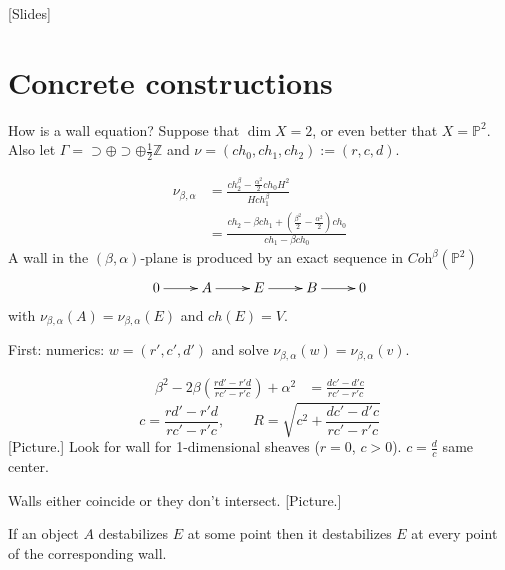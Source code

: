 [Slides]

\section{Concrete constructions}
\label{section-concrete-constructions}

How is a wall equation? Suppose that $\dim X=2$, or even better that $X=
\mathbb{P}^2$. Also let 
$\Gamma=\supset \oplus \supset \oplus \frac{1}{2}\mathbb{Z}$ and 
$\nu=(ch_0,ch_1,ch_2):=(r,c,d)$.

\begin{align*}
\nu_{\beta,\alpha}&=\frac{ch_2^\beta-\frac{\alpha^2}{2}ch_0H^2}{H ch_1^\beta}\\
&=\frac{ch_2-\beta ch_1+\left(\frac{\beta^2}{2}-
\frac{\alpha^2}{2}\right)ch_0}{ch_1-\beta ch_0}
\end{align*}
A wall in the $(\beta,\alpha)$-plane is produced by an exact sequence in 
$\textit{Coh}^\beta(\mathbb{P}^2)$
$$
\xymatrix{
0\ar[r]&A\ar[r]&E\ar[r]&B\ar[r]&0
}
$$
with $\nu_{\beta,\alpha}(A)=\nu_{\beta,\alpha}(E)$ and $ch(E)=V$.

\medskip\noindent
First: numerics: $w=(r',c',d')$ and solve
$\nu_{\beta,\alpha}(w)=\nu_{\beta,\alpha}(v)$.

\begin{align*}
\beta^2-2\beta\left(\frac{rd'-r'd}{rc'-r'c}\right)+\alpha^2&=
\frac{d c'-d'c}{rc'-r'c}
\end{align*}
$$
c=\frac{rd'-r'd}{rc'-r'c},\qquad R=\sqrt{c^2+\frac{d c'-d'c}{rc'-r'c}}
$$
[Picture.] 
Look for wall for 1-dimensional sheaves ($r=0$, $c>0$). $c=\frac{d}{c}$ same
center.

\begin{remark}
\label{remark-walls-coincide-or-dont-intersect}
Walls either coincide or they don't intersect. [Picture.]
\end{remark}

\begin{lemma}
\label{lemma-Bertan}
If an object $A$ destabilizes $E$ at some point then it destabilizes $E$ at
every point of the corresponding wall.
\end{lemma}

